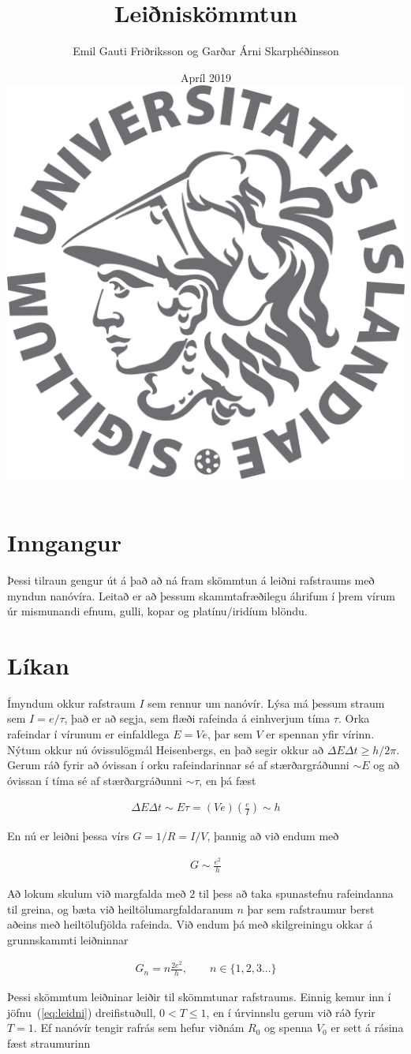 \documentclass[11pt]{article}
\title{{\Huge Leiðniskömmtun}}
\author{Emil Gauti Friðriksson og Garðar Árni Skarphéðinsson}
\date{Apríl 2019 \\
\vspace{5cm}
\includegraphics[width = .6\textwidth]{HIlogo1.png}}
\begin{document}
\maketitle
\thispagestyle{empty}

\newpage

\section{Inngangur}
Þessi tilraun gengur út á það að ná fram skömmtun á leiðni rafstraums með myndun nanóvíra. Leitað er að þessum skammtafræðilegu áhrifum í þrem vírum úr mismunandi efnum, gulli, kopar og platínu/iridíum blöndu. 

\section{Líkan}
Ímyndum okkur rafstraum $I$ sem rennur um nanóvír. Lýsa má þessum straum sem $I = e/\tau$, það er að segja, sem flæði rafeinda á einhverjum tíma $\tau$. Orka rafeindar í vírunum er einfaldlega $E = V e$, þar sem $V$ er spennan yfir vírinn. Nýtum okkur nú óvissulögmál Heisenbergs, en það segir okkur að $\Delta E\Delta t \geq h/2\pi$. Gerum ráð fyrir að óvissan í orku rafeindarinnar sé af stærðargráðunni $\sim E$ og að óvissan í tíma sé af stærðargráðunni $\sim \tau$, en þá fæst

\begin{align}
\Delta E \Delta t \sim E \tau = (Ve)\left( \frac{e}{I} \right) \sim h
\end{align}

En nú er leiðni þessa vírs $G = 1/R = I/V$, þannig að við endum með 

\begin{align}
G \sim \frac{e^2}{h}
\end{align}

Að lokum skulum við margfalda með $2$ til þess að taka spunastefnu rafeindanna til greina, og bæta við heiltölumargfaldaranum $n$ þar sem rafstraumur berst aðeins með heiltölufjölda rafeinda. Við endum þá með skilgreiningu okkar á grunnskammti leiðninnar

\begin{align}
G_n = n \frac{2e^2}{h}, \qquad  n \in \{1, 2, 3 ...\}
\label{eq:leidni}
\end{align}

Þessi skömmtum leiðninar leiðir til skömmtunar rafstraums. Einnig kemur inn í jöfnu~(\ref{eq:leidni}) dreifistuðull, $0<T\leq 1$, en í úrvinnslu gerum við ráð fyrir $T=1$. Ef nanóvír tengir rafrás sem hefur viðnám $R_0$ og spenna $V_0$ er sett á rásina fæst straumurinn
\end{document}
